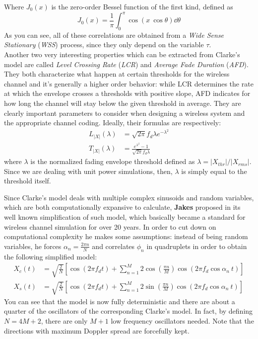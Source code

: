 %
Where $J_0(x)$ is the zero-order Bessel function of the first kind, defined as%
%
\begin{equation}
J_0(x) = \frac{1}{\pi} \int_0^\pi \cos( x \ \cos\theta) \dd{\theta}
\end{equation}%
%
As you can see, all of these correlations are obtained from a \textit{Wide Sense Stationary} (\textit{WSS}) process, since they only depend on the variable $\tau$.\\
Another two very interesting properties which can be extracted from Clarke's model are called \textit{Level Crossing Rate} (\textit{LCR}) and \textit{Average Fade Duration} (\textit{AFD}). They both characterize what happen at certain thresholds for the wireless channel and it's generally a higher order behavior: while LCR determines the rate at which the envelope crosses a thresholds with positive slope, AFD indicates for how long the channel will stay below the given threshold in average. They are clearly important parameters to consider when designing a wireless system and the appropriate channel coding. Ideally, their formulas are respectively:%
%
\begin{align}
L_{|X|}(\lambda) &= \sqrt{2\pi} f_d \lambda e^{-\lambda^2}\\
T_{|X|}(\lambda) &= \frac{e^{\lambda^2} - 1}{\sqrt{2\pi} f_d \lambda}
\end{align}%
%
where $\lambda$ is the normalized fading envelope threshold defined as $\lambda = |X_{thr}|/|X_{rms}|$. Since we are dealing with unit power simulations, then, $\lambda$ is simply equal to the threshold itself.

Since Clarke's model deals with multiple complex sinusoids and random variables, which are both computationally expansive to calculate, \textbf{Jakes} proposed in \cite{jakes} its well known simplification of such model, which basically became a standard for wireless channel simulation for over 20 years. In order to cut down on computational complexity he makes some assumptions: instead of being random variables, he forces $\alpha_n = \frac{2\pi n}{N}$ and correlates $\phi_n$ in quadruplets in order to obtain the following simplified model:%
%
\begin{subequations}
\begin{align}\label{eq:jakes_xc}
X_c(t) &= \sqrt{\frac{2}{N}} \left[ \cos(2\pi f_d t) + \sum_{n=1}^{M} 2\cos \left( \frac{\pi n}{M} \right) \cos( 2\pi f_d \cos \alpha_n \ t) \right]\\
\label{eq:jakes_xs}
X_s(t) &= \sqrt{\frac{2}{N}} \left[ \cos(2\pi f_d t) + \sum_{n=1}^{M} 2\sin \left( \frac{\pi n}{M} \right) \cos( 2\pi f_d \cos \alpha_n \ t) \right]
\end{align}
\end{subequations}%
%
You can see that the model is now fully deterministic and there are about a quarter of the oscillators of the corresponding Clarke's model. In fact, by defining $N = 4M+2$, there are only $M+1$ low frequency oscillators needed. Note that the directions with maximum Doppler spread are forcefully kept.

